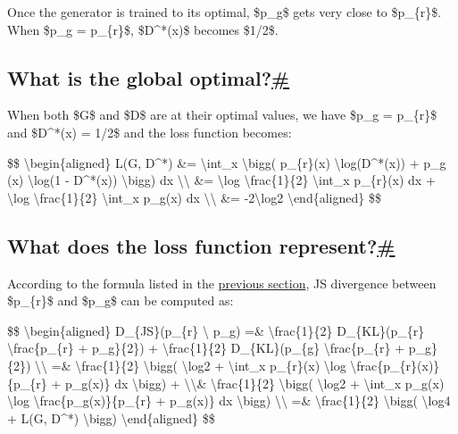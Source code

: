Once the generator is trained to its optimal, \$p\_g\$ gets very close to \$p\_\{r\}\$. When \$p\_g = p\_\{r\}\$, \$D\^{}*(x)\$ becomes \$1/2\$.

\subsection{\texorpdfstring{What is the global optimal?\hyperref[what-is-the-global-optimal]{\#}}{What is the global optimal?\#}}\label{what-is-the-global-optimal}

When both \$G\$ and \$D\$ are at their optimal values, we have \$p\_g = p\_\{r\}\$ and \$D\^{}*(x) = 1/2\$ and the loss function becomes:

\$\$ \textbackslash begin\{aligned\} L(G, D\^{}*) \&= \textbackslash int\_x \textbackslash bigg( p\_\{r\}(x) \textbackslash log(D\^{}*(x)) + p\_g (x) \textbackslash log(1 - D\^{}*(x)) \textbackslash bigg) dx \textbackslash\textbackslash{} \&= \textbackslash log \textbackslash frac\{1\}\{2\} \textbackslash int\_x p\_\{r\}(x) dx + \textbackslash log \textbackslash frac\{1\}\{2\} \textbackslash int\_x p\_g(x) dx \textbackslash\textbackslash{} \&= -2\textbackslash log2 \textbackslash end\{aligned\} \$\$

\subsection{\texorpdfstring{What does the loss function represent?\hyperref[what-does-the-loss-function-represent]{\#}}{What does the loss function represent?\#}}\label{what-does-the-loss-function-represent}

According to the formula listed in the \href{https://lilianweng.github.io/posts/2017-08-20-gan/\#kullbackleibler-and-jensenshannon-divergence}{previous section}, JS divergence between \$p\_\{r\}\$ and \$p\_g\$ can be computed as:

\$\$ \textbackslash begin\{aligned\} D\_\{JS\}(p\_\{r\} \textbackslash\textbar{} p\_g) =\& \textbackslash frac\{1\}\{2\} D\_\{KL\}(p\_\{r\} \textbar\textbar{} \textbackslash frac\{p\_\{r\} + p\_g\}\{2\}) + \textbackslash frac\{1\}\{2\} D\_\{KL\}(p\_\{g\} \textbar\textbar{} \textbackslash frac\{p\_\{r\} + p\_g\}\{2\}) \textbackslash\textbackslash{} =\& \textbackslash frac\{1\}\{2\} \textbackslash bigg( \textbackslash log2 + \textbackslash int\_x p\_\{r\}(x) \textbackslash log \textbackslash frac\{p\_\{r\}(x)\}\{p\_\{r\} + p\_g(x)\} dx \textbackslash bigg) + \textbackslash\textbackslash\& \textbackslash frac\{1\}\{2\} \textbackslash bigg( \textbackslash log2 + \textbackslash int\_x p\_g(x) \textbackslash log \textbackslash frac\{p\_g(x)\}\{p\_\{r\} + p\_g(x)\} dx \textbackslash bigg) \textbackslash\textbackslash{} =\& \textbackslash frac\{1\}\{2\} \textbackslash bigg( \textbackslash log4 + L(G, D\^{}*) \textbackslash bigg) \textbackslash end\{aligned\} \$\$

